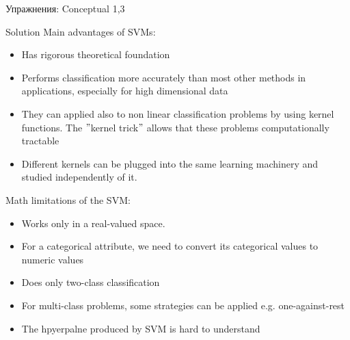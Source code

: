 Упражнения: Conceptual 1,3 


Solution
Main	  advantages of	  SVMs:
\begin{itemize}
\item Has rigorous theoretical foundation
\item Performs classification more accurately than most other methods in applications, especially for high dimensional data
\item They can applied also to non linear classification problems by using kernel functions. The $"$kernel trick$"$ allows that these problems computationally tractable
\item  Different kernels can be plugged into the same learning machinery and studied independently of it.
\end{itemize}

Math limitations of the SVM:
\begin{itemize}
	\item Works only in a real-valued space.
	\item For a categorical attribute, we need to convert its categorical values to numeric values
	\item Does only two-class classification
	\item For multi-class problems, some strategies can be applied e.g. one-against-rest
	\item The hpyerpalne produced by SVM is hard to understand
\end{itemize}
\newpage
